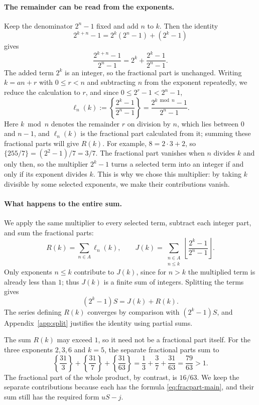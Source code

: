\documentclass[10pt]{article}
\theoremstyle{plain}
\theoremstyle{definition}
\theoremstyle{remark}
\newcommand{\lft}{\ell}
\begin{document}
\paragraph{The remainder can be read from the exponents.}
Keep the denominator $2^n-1$ fixed and add $n$ to $k$. Then the identity
\[
 2^{k+n}-1=2^k(2^n-1)+(2^k-1)
\]
gives
\[
 \frac{2^{k+n}-1}{2^n-1}=2^k+\frac{2^k-1}{2^n-1}.
\]
The added term $2^k$ is an integer, so the fractional part is
unchanged. Writing $k=an+r$ with $0\le r<n$ and subtracting $n$ from the
exponent repeatedly, we reduce the calculation to $r$, and since
$0\le2^r-1<2^n-1$,
\begin{equation}\label{eq:fracpart-main}
 \lft_n(k):=\left\{\frac{2^k-1}{2^n-1}\right\}
 =\frac{2^{k\bmod n}-1}{2^n-1}.
\end{equation}
Here $k\bmod n$ denotes the remainder $r$ on division by $n$, which
lies between $0$ and $n-1$, and $\lft_n(k)$ is the fractional part
calculated from it; summing these fractional parts will give $R(k)$. For
example, $8=2\cdot3+2$, so $\{255/7\}=(2^2-1)/7=3/7$. The fractional
part vanishes when $n$ divides $k$ and only then, so the multiplier
$2^k-1$ turns a selected term into an integer if and only if its
exponent divides $k$. This is why we chose this multiplier: by taking
$k$ divisible by some selected exponents, we make their contributions
vanish.

\pagebreak[0]
\begin{samepage}
\paragraph{What happens to the entire sum.}
We apply the same multiplier to every selected term, subtract each
integer part, and sum the fractional parts:
\[
 R(k)=\sum_{n\in A}\lft_n(k),\qquad
 J(k)=\sum_{\substack{n\in A\\ n\le k}}
       \left\lfloor\frac{2^k-1}{2^n-1}\right\rfloor.
\]
Only exponents $n\le k$ contribute to $J(k)$, since for $n>k$ the
multiplied term is already less than $1$; thus $J(k)$ is a finite sum of
integers. Splitting the terms gives
\begin{equation}\label{eq:split-main}
 (2^k-1)S=J(k)+R(k).
\end{equation}
The series defining $R(k)$ converges by comparison with $(2^k-1)S$, and
Appendix~\ref{app:split} justifies the identity using partial sums.\par
\end{samepage}

The sum $R(k)$ may exceed $1$, so it need not be a fractional part
itself. For the three exponents $2,3,6$ and $k=5$, the separate
fractional parts sum to
\[
 \left\{\frac{31}3\right\}+\left\{\frac{31}7\right\}
 +\left\{\frac{31}{63}\right\}
 =\frac13+\frac37+\frac{31}{63}=\frac{79}{63}>1.
\]
The fractional part of the whole product, by contrast, is $16/63$. We keep
the separate contributions because each has the formula
\eqref{eq:fracpart-main}, and their sum still has the required form
$uS-j$.
\end{document}
